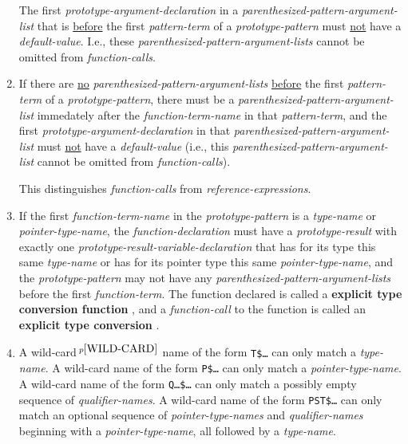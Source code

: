 \documentclass[12pt]{article}
\newcommand{\key}[1]{{\rm \bfseries #1}}
\newcommand{\pagnote}[1]{$\,^{p\pageref{#1}}$}
\begin{document}
\begin{enumerate}
The first {\em prototype-argument-declaration}
in a {\em parenthesized-pattern-argument-list} that is
\underline{before} the first {\em pattern-term} of a
{\em prototype-pattern} must \underline{not} have a {\em default-value}.
I.e., these {\em parenthesized-pattern-argument-lists} cannot be omitted from
{\em function-calls}.
\item
If there are \underline{no} {\em parenthesized-pattern-argument-lists}
\underline{before} the first {\em pattern-term} of a
{\em prototype-pattern}, there must be a
{\em parenthesized-pattern-argument-list}
immedately after the {\em function-term-name} in that {\em pattern-term},
and the first {\em prototype-argument-declaration} in that
{\em parenthesized-pattern-argument-list}
must \underline{not} have a {\em default-value}
(i.e., this {\em parenthesized-pattern-argument-list} cannot be omitted from
{\em function-calls}).

This distinguishes {\em function-calls} from {\em reference-expressions}.
\item
If the first {\em function-term-name} in the {\em prototype-pattern}
is a {\em type-name} or {\em pointer-type-name},
the {\em function-declaration} must have
a {\em prototype-result} with exactly
one {\em prototype-result-variable-declaration}
that has for its type this same {\em type-name} or has for its pointer type
this same {\em pointer-type-name},
and the {\em prototype-pattern} may not have any
{\em parenthesized-pattern-argument-lists} before the first
{\em function-term}.  The function
declared is called a \key{explicit type conversion function}%
\label{EXPLICIT-TYPE-CONVERSION-FUNCTION}, and a {\em function-call}
to the function is called an \key{explicit type conversion}%
\label{EXPLICIT-TYPE-CONVERSION}.
\item\label{PROTOTYPE-WILD-CARDS}
A wild-card\pagnote{WILD-CARD} name of the form {\tt T\$\ldots}
can only match a {\em type-name}.
A wild-card name of the form {\tt P\$\ldots} can only match a
{\em pointer-type-name}.
A wild-card name of the form {\tt Q\ldots\$\ldots} can only match a
possibly empty sequence of {\em qualifier-names}.
A wild-card name of the form {\tt PST\$\ldots} can only match an
optional sequence of {\em pointer-type-names} and {\em qualifier-names}
beginning with a {\em pointer-type-name}, all followed by a {\em type-name}.


\end{enumerate}
\end{document}
